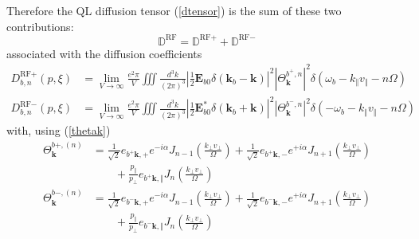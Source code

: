 Therefore the QL diffusion tensor (\ref{dtensor}) is the sum of these two
contributions:%
\begin{equation}
\mathbb{{D}}^{\text{RF}}=\mathbb{{D}}^{\text{RF}+}+\mathbb{{D}}^{\text{RF}-}%
\end{equation}
associated with the diffusion coefficients%
\begin{align}
D_{b,n}^{\text{RF}+}(p,\xi)  &  =\lim_{V\rightarrow\infty}\frac{e^{2}\pi}%
{V}\iiint\frac{d^{3}k}{(2\pi)^{3}}\left|  \frac{1}{2}\mathbf{E}_{b0}%
\delta\left(  \mathbf{k}_{b}-\mathbf{k}\right)  \right|  ^{2}\left|
\Theta_{\mathbf{k}}^{b^{+},n}\right|  ^{2}\delta\left(  \omega_{b}-k_{\Vert
}v_{\Vert}-n\Omega\right) \label{dbnp}\\
D_{b,n}^{\text{RF}-}(p,\xi)  &  =\lim_{V\rightarrow\infty}\frac{e^{2}\pi}%
{V}\iiint\frac{d^{3}k}{(2\pi)^{3}}\left|  \frac{1}{2}\mathbf{E}_{b0}^{\ast
}\delta\left(  \mathbf{k}_{b}+\mathbf{k}\right)  \right|  ^{2}\left|
\Theta_{\mathbf{k}}^{b^{-},n}\right|  ^{2}\delta\left(  -\omega_{b}-k_{\Vert
}v_{\Vert}-n\Omega\right) \nonumber
\end{align}
with, using (\ref{thetak})%
\begin{align}
\Theta_{\mathbf{k}}^{b+,\left(  n\right)  }  &  =\frac{1}{\sqrt{2}}%
e_{b^{+}\mathbf{k},+}e^{-i\alpha}J_{n-1}\left(  \frac{k_{\bot}v_{\bot}}%
{\Omega}\right)  +\frac{1}{\sqrt{2}}e_{b^{+}\mathbf{k},-}e^{+i\alpha}%
J_{n+1}\left(  \frac{k_{\bot}v_{\bot}}{\Omega}\right)  \nonumber\\&\qquad+\frac{p_{\Vert}%
}{p_{\bot}}e_{b^{+}\mathbf{k},\Vert}J_{n}\left(  \frac{k_{\bot}v_{\bot}%
}{\Omega}\right) \label{thetakp}\\
\Theta_{\mathbf{k}}^{b-,\left(  n\right)  }  &  =\frac{1}{\sqrt{2}}%
e_{b^{-}\mathbf{k},+}e^{-i\alpha}J_{n-1}\left(  \frac{k_{\bot}v_{\bot}}%
{\Omega}\right)  +\frac{1}{\sqrt{2}}e_{b^{-}\mathbf{k},-}e^{+i\alpha}%
J_{n+1}\left(  \frac{k_{\bot}v_{\bot}}{\Omega}\right)  \nonumber\\&\qquad+\frac{p_{\Vert}%
}{p_{\bot}}e_{b^{-}\mathbf{k},\Vert}J_{n}\left(  \frac{k_{\bot}v_{\bot}%
}{\Omega}\right) \nonumber
\end{align}

